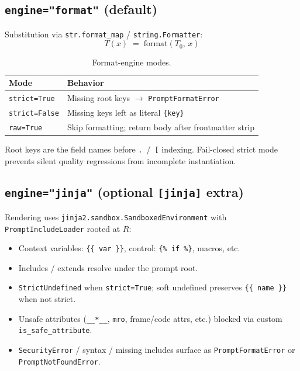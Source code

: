 \documentclass[11pt,a4paper]{article}
\newcommand{\code}[1]{\texttt{#1}}
\begin{document}
\subsection{\texttt{engine="format"} (default)}

Substitution via \code{str.format\_map} / \code{string.Formatter}:
\begin{equation}
  T(x) \;=\; \mathrm{format}(T_0,\, x)
\end{equation}

\begin{table}[htbp]
  \centering
  \begin{tabular}{@{}lp{}@{}}
    \toprule
    \textbf{Mode} & \textbf{Behavior} \\
    \midrule
    \code{strict=True}
      & Missing root keys $\rightarrow$ \code{PromptFormatError} \\
    \code{strict=False}
      & Missing keys left as literal \texttt{\{key\}} \\
    \code{raw=True}
      & Skip formatting; return body after frontmatter strip \\
    \bottomrule
  \end{tabular}
  \caption{Format-engine modes.}
  \label{tab:format-modes}
\end{table}

Root keys are the field names before \texttt{.}~/~\texttt{[} indexing.
Fail-closed strict mode prevents silent quality regressions from incomplete
instantiation.

\subsection{\texttt{engine="jinja"} (optional \texttt{[jinja]} extra)}

Rendering uses \code{jinja2.sandbox.SandboxedEnvironment} with
\code{PromptIncludeLoader} rooted at $R$:
\begin{itemize}[leftmargin=*]
  \item Context variables: \texttt{\{\{ var \}\}}, control:
        \texttt{\{\% if \%\}}, macros, etc.
  \item Includes / extends resolve under the prompt root.
  \item \code{StrictUndefined} when \code{strict=True}; soft undefined
        preserves \texttt{\{\{ name \}\}} when not strict.
  \item Unsafe attributes (\texttt{\_\_*\_\_}, \code{mro}, frame/code attrs,
        etc.) blocked via custom \code{is\_safe\_attribute}.
  \item \code{SecurityError} / syntax / missing includes surface as
        \code{PromptFormatError} or \code{PromptNotFoundError}.
\end{itemize}
\end{document}
